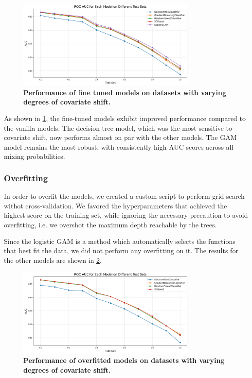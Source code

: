 \begin{figure}[H]
    \centering
    \includegraphics[width=0.8\textwidth]{assets/tuned.png} 
    \caption{\textbf{Performance of fine tuned models on datasets with varying degrees of covariate shift.}}
    \label{fig:tuned-models-perf}
\end{figure}

As shown in \cref{fig:tuned-models-perf}, the fine-tuned models exhibit improved performance compared to the vanilla models. The decision tree model, which was the most sensitive to covariate shift, now performs almost on par with the other models. The GAM model remains the most robust, with consistently high AUC scores across all mixing probabilities.

\subsubsection{Overfitting}

In order to overfit the models, we created a custom script to perform grid search withot cross-validation. We favored the hyperparameters that achieved the highest score on the training set, while ignoring the necessary precaution to avoid overfitting, i.e. we overshot the maximum depth reachable by the trees.

Since the logistic GAM is a method which automatically selects the functions that best fit the data, we did not perform any overfitting on it. The results for the other models are shown in \cref{fig:overfitted-models-perf}.

\begin{figure}[H]
    \centering
    \includegraphics[width=0.8\textwidth]{assets/overfit_no_gam.png} 
    \caption{\textbf{Performance of overfitted models on datasets with varying degrees of covariate shift.}}
    \label{fig:overfitted-models-perf}
\end{figure}


